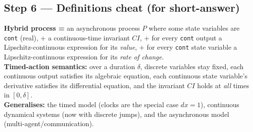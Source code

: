 \subsection*{Step 6 --- Definitions cheat (for short-answer)}
\textbf{Hybrid process = } an asynchronous process $P$ where some state variables are \texttt{cont}
(real), $+$ a continuous-time invariant $CI$, $+$ for every \texttt{cont} output a
Lipschitz-continuous expression for its \emph{value}, $+$ for every \texttt{cont} state variable a
Lipschitz-continuous expression for its \emph{rate of change}.\\
\textbf{Timed-action semantics:} over a duration $\delta$, discrete variables stay fixed, each
continuous output satisfies its algebraic equation, each continuous state variable's derivative
satisfies its differential equation, and the invariant $CI$ holds at \emph{all} times in $[0,\delta]$.\\
\textbf{Generalises:} the timed model (clocks are the special case $dx=1$), continuous dynamical
systems (now with discrete jumps), and the asynchronous model (multi-agent/communication).